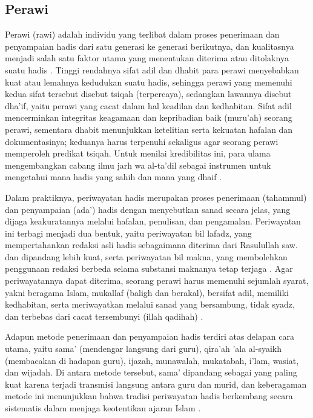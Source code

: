 \subsection{Perawi}
Perawi (rawi) adalah individu yang terlibat dalam proses penerimaan dan penyampaian hadis dari satu generasi ke generasi berikutnya, dan kualitasnya menjadi salah satu faktor utama yang menentukan diterima atau ditolaknya suatu hadis \cite{Syafii2022Ketsiqohan}. 
Tinggi rendahnya sifat adil dan dhabit para perawi menyebabkan kuat atau lemahnya kedudukan suatu hadis, sehingga perawi yang memenuhi kedua sifat tersebut disebut tsiqah (terpercaya), sedangkan lawannya disebut dha'if, yaitu perawi yang cacat dalam hal keadilan dan kedhabitan. 
Sifat adil mencerminkan integritas keagamaan dan kepribadian baik (muru'ah) seorang perawi, sementara dhabit menunjukkan ketelitian serta kekuatan hafalan dan dokumentasinya; keduanya harus terpenuhi sekaligus agar seorang perawi memperoleh predikat tsiqah. Untuk menilai kredibilitas ini, para ulama mengembangkan cabang ilmu jarh wa al-ta'dil sebagai instrumen untuk mengetahui mana hadis yang sahih dan mana yang dhaif \cite{Syafii2022Ketsiqohan}.

Dalam praktiknya, periwayatan hadis merupakan proses penerimaan (tahammul) dan penyampaian (ada') hadis dengan menyebutkan sanad secara jelas, yang dijaga keakuratannya melalui hafalan, penulisan, dan pengamalan. Periwayatan ini terbagi menjadi dua bentuk, yaitu periwayatan bil lafadz, yang mempertahankan redaksi asli hadis sebagaimana diterima dari Rasulullah saw. dan dipandang lebih kuat, serta periwayatan bil makna, yang membolehkan penggunaan redaksi berbeda selama substansi maknanya tetap terjaga \cite{hatta2026teknik}. Agar periwayatannya dapat diterima, seorang perawi harus memenuhi sejumlah syarat, yakni beragama Islam, mukallaf (baligh dan berakal), bersifat adil, memiliki kedhabitan, serta meriwayatkan melalui sanad yang bersambung, tidak syadz, dan terbebas dari cacat tersembunyi (illah qadihah) \cite{hatta2026teknik}.

Adapun metode penerimaan dan penyampaian hadis terdiri atas delapan cara utama, yaitu sama' (mendengar langsung dari guru), qira'ah 'ala al-syaikh (membacakan di hadapan guru), ijazah, munawalah, mukatabah, i'lam, wasiat, dan wijadah. 
Di antara metode tersebut, sama' dipandang sebagai yang paling kuat karena terjadi transmisi langsung antara guru dan murid, dan keberagaman metode ini menunjukkan bahwa tradisi periwayatan hadis berkembang secara sistematis dalam menjaga keotentikan ajaran Islam \cite{hatta2026teknik}.

